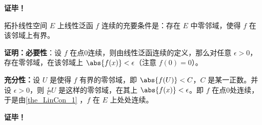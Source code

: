 \textbf{证毕！}

\begin{theorem}{}\label{the_LinCon_2}
 拓扑线性空间 $E$ 上线性泛函 $f$ 连续的充要条件是：存在 $E$ 中零邻域，使得 $f$ 在该邻域上有界。
\end{theorem}

\textbf{证明：}\textbf{必要性}：设 $f$ 在点0连续，则由线性泛函连续的定义，那么对任意 $\epsilon>0$，存在零邻域，在该邻域上 $\abs{f(x)}<\epsilon$（注意 $f(0)=0$）。

\textbf{充分性：}设 $U$ 是使得 $f$ 有界的零邻域，即 $\abs{f(U)}<C$，$C$ 是某一正数。并设 $\epsilon>0$，则 $\frac{\epsilon}{C}U$ 是这样的零邻域，在其上 $\abs{f(x)}<\epsilon$。即 $f$ 在点0处连续，于是由\autoref{the_LinCon_1} ，$f$ 在 $E$ 上处处连续。



\textbf{证毕！}




